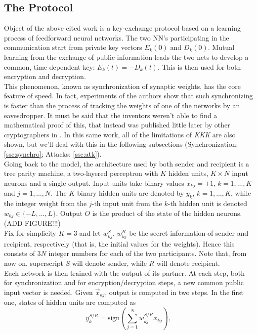 \documentclass[%
    corpo=11pt,
    twoside,
    stile=classica,
    oldstyle,
    autoretitolo,
    tipotesi=magistrale,
    greek,
    evenboxes,
    english
]{toptesi}
\newcommand{\sign}{\text{sign}}
\begin{document}
\subsection{The Protocol}
Object of the above cited work is a key-exchange protocol based on a learning process of feedforward neural networks. The two NN's participating in the communication start from private key vectors $E_k(0)$ and $D_k(0)$. Mutual learning from the exchange of public information leads the two nets to develop a common, time dependent key: $E_k(t) = - D_k(t)$. This is then used for both encryption and decryption. \\
This phenomenon, known as synchronization of synaptic weights, has the core feature of speed. In fact, experiments of the authors show that such synchronizing is faster than the process of tracking the weights of one of the networks by an eavesdropper. It must be said that the inventors weren't able to find a mathematical proof of this, that instead was published little later by other cryptographers in \cite{shamir}. In this same work, all of the limitations of \textit{KKK} are also shown, but we'll deal with this in the following subsections (Synchronization: \ref{ssc:synchro}; Attacks: \ref{ssc:atk}).  \\
Going back to the model, the architecture used by both sender and recipient is a tree parity machine, a two-layered perceptron with $K$ hidden units, $K \times N$ input neurons and a single output. Input units take binary values $x_{kj} = \pm 1$, $k = 1,\dots, K$ and $j = 1, \dots, N$. The $K$ binary hidden units are denoted by $y_k$, $k = 1,\dots, K$, while the integer weight from the $j$-th input unit from the $k$-th hidden unit is denoted $w_{kj}\in\{-L,\dots,L\}$. Output $O$ is the product of the state of the hidden neurons. (ADD FIGURE!!!) \\
Fix for simplicity $K = 3$ and let $w_{kj}^S$, $w_{kj}^R$ be the secret information of sender and recipient, respectively (that is, the initial values for the weights). Hence this consists of $3N$ integer numbers for each of the two participants.  Note that, from now on, superscript $S$ will denote sender, while $R$ will denote recipient. \\
Each network is then trained with the output of its partner. At each step, both for synchronization and for encryption/decryption steps, a new common public input vector is needed. Given $\vec{x}_{kj}$, output is computed in two steps. In the first one, states of hidden units are computed as 
\begin{equation}
y_k^{S/R} = \sign\left(\sum_{j=1}^{N}w_{kj}^{S/R}x_{kj}\right),
\end{equation}
\end{document}

